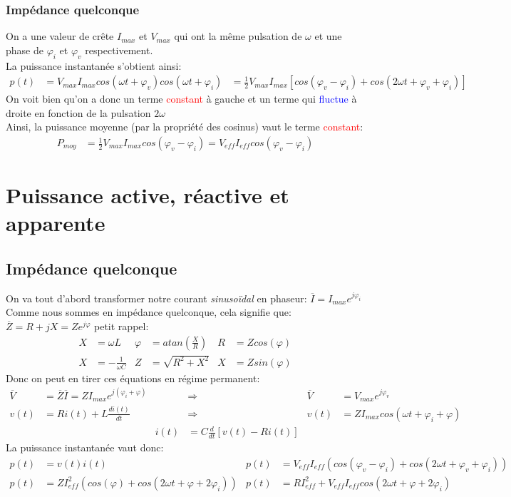 \documentclass{report}
\begin{document}
\subsubsection{Impédance quelconque}
On a une valeur de crête $I_{max}$ et $V_{max}$ qui ont la même pulsation de $\omega$ et une phase de $\varphi_i$ et $\varphi_v$ respectivement.\\
La puissance instantanée s'obtient ainsi:
\begin{align*}
p(t) &= V_{max}I_{max}cos(\omega t + \varphi_v) cos(\omega t + \varphi_i)
&= \frac{1}{2}V_{max}I_{max} [cos(\varphi_v -\varphi_i) + cos(2 \omega t + \varphi_v + \varphi_i)]
\end{align*}
On voit bien qu'on a donc un terme \textcolor{red}{constant} à gauche et un terme qui \textcolor{blue}{fluctue} à droite en fonction de la pulsation $2 \omega$\\
Ainsi, la puissance moyenne (par la propriété des cosinus) vaut le terme \textcolor{red}{constant}:
\begin{align*}
P_{moy} &= \frac{1}{2}V_{max}I_{max} cos(\varphi_v -\varphi_i) = V_{eff}I_{eff}cos(\varphi_v -\varphi_i)
\end{align*}

\section{Puissance active, réactive et apparente}
\subsection{Impédance quelconque}
On va tout d'abord transformer notre courant \textit{sinusoïdal} en phaseur: $\overline{I} = I_{max}e^{j\varphi_i}$\\
Comme nous sommes en impédance quelconque, cela signifie que: $\overline{Z} = R + j X = Z e^{j \varphi}$ petit rappel:
\begin{align*}
X &= \omega L & \varphi &= atan(\frac{X}{R}) & R &= Z cos(\varphi)\\
X &=  -\frac{1}{\omega C} & Z &= \sqrt{R^2 + X^2} & X &= Z sin(\varphi)
\end{align*}
Donc on peut en tirer ces équations en régime permanent:
\begin{align*}
\overline{V} &= \overline{Z} \overline{I}  = Z I_{max}e^{j (\varphi_i + \varphi)} & &\Rightarrow & \overline{V} &= V_{max}e^{j\varphi_v}\\
v(t) &= Ri(t) + L \frac{di(t)}{dt} & &\Rightarrow & v(t) &= Z I_{max} cos(\omega t + \varphi_i + \varphi)\\
& & i(t) &= C\frac{d}{dt}[v(t) -Ri(t)] & &
\end{align*}
La puissance instantanée vaut donc:
\begin{align*}
p(t) &= v(t) i(t) & p(t) &= V_{eff} I_{eff}(cos(\varphi_v - \varphi_i) + cos(2 \omega t + \varphi_v + \varphi_i ))\\
p(t) &= ZI_{eff}^2(cos(\varphi ) + cos(2 \omega t + \varphi + 2\varphi_i )) & p(t) &= RI_{eff}^2 + V_{eff}I_{eff} cos(2 \omega t + \varphi + 2\varphi_i )
\end{align*}
\end{document}
